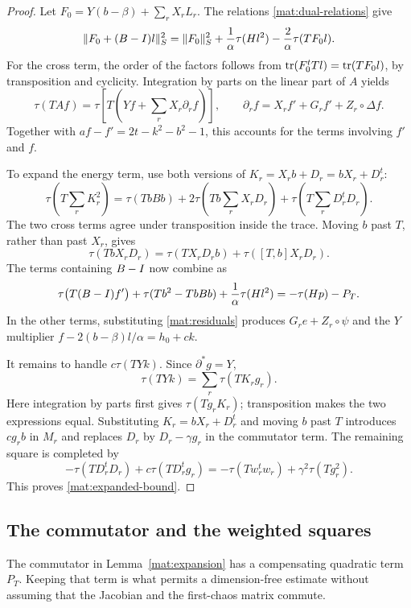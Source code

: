 \begin{proof}
Let $F_0=Y(b-\beta)+\sum_rX_rL_r$.  The relations
\eqref{mat:dual-relations} give
\[
 \|F_0+(B-I)l\|_S^2
 =\|F_0\|_S^2+\frac1\alpha\tau(Hl^2)
                    -\frac2\alpha\tau(TF_0l).
\]
For the cross term, the order of the factors follows from
$\operatorname{tr}(F_0^tTl)=\operatorname{tr}(TF_0l)$, by transposition and cyclicity.
Integration by parts on the linear part of $A$ yields
\[
 \tau(TAf)=\tau\left[T\left(Yf+\sum_rX_r\partial_rf\right)\right],
 \qquad
 \partial_rf=X_rf'+G_rf'+Z_r\circ\Delta f.
\]
Together with $af-f'=2t-k^2-b^2-1$, this accounts for the terms involving
$f'$ and $f$.

To expand the energy term, use both versions of
$K_r=X_rb+D_r=bX_r+D_r^t$:
\begin{equation}\label{mat:K-square}
 \tau\left(T\sum_rK_r^2\right)
 =\tau(TbBb)+2\tau\left(Tb\sum_rX_rD_r\right)
             +\tau\left(T\sum_rD_r^tD_r\right).
\end{equation}
The two cross terms agree under transposition inside the trace.  Moving
$b$ past $T$, rather than past $X_r$, gives
\[
 \tau(TbX_rD_r)=\tau(TX_rD_rb)+\tau([T,b]X_rD_r).
\]
The terms containing $B-I$ now combine as
\[
 \tau\bigl(T(B-I)f'\bigr)+\tau(Tb^2-TbBb)
                 +\frac1\alpha\tau(Hl^2)
 =-\tau(Hp)-P_T.
\]
In the other terms, substituting \eqref{mat:residuals} produces
$G_re+Z_r\circ\psi$ and the $Y$ multiplier
$f-2(b-\beta)l/\alpha=h_0+ck$.

It remains to handle $c\tau(TYk)$.  Since $\partial^*g=Y$,
\[
 \tau(TYk)=\sum_r\tau(TK_rg_r).
\]
Here integration by parts first gives $\tau(Tg_rK_r)$; transposition
makes the two expressions equal.  Substituting $K_r=bX_r+D_r^t$ and
moving $b$ past $T$ introduces $cg_rb$ in $M_r$ and replaces $D_r$ by
$D_r-\gamma g_r$ in the commutator term.  The remaining square is
completed by
\[
 -\tau(TD_r^tD_r)+c\tau(TD_r^tg_r)
 =-\tau(Tw_r^tw_r)+\gamma^2\tau(Tg_r^2).
\]
This proves \eqref{mat:expanded-bound}.
\end{proof}

\subsection{The commutator and the weighted squares}

The commutator in Lemma~\ref{mat:expansion} has a compensating quadratic
term $P_T$.  Keeping that term is what permits a dimension-free estimate
without assuming that the Jacobian and the first-chaos matrix commute.


